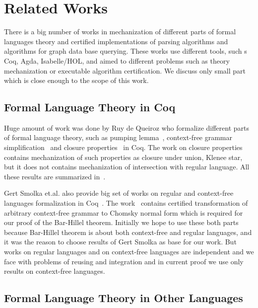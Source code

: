 \section{Related Works}

There is a big number of works in mechanization of different parts of formal languages theory and certified implementations of parsing algorithms and algorithms for graph data base querying.
These works use different tools, such s Coq, Agda, Isabelle/HOL, and aimed to different problems such as theory mechanization or executable algorithm certification.
We discuss only small part which is close enough to the scope of this work.

\subsection{Formal Language Theory in Coq}

Huge amount of work was done by Ruy de Queiroz who formalize different parts of formal language theory, such as pumping lemma~\cite{ramos2015formalizationPumping}, context-free grammar simplification~\cite{ramos2015formalization} and closure properties~\cite{ramos2015formalizationClosure} in Coq.
The work on closure properties contains mechanization of such properties as closure under union, Klenee star, but it does not contains mechanization of intersection with regular language.
All these results are summarized in~\cite{ramos2016formalization}. 

Gert Smolka et.al. also provide big set of works on regular and context-free languages formalization in Coq~\cite{smolka2017regular,smolka2013regular,kaiser2012constructive,smolkaHofmann2016}.
The work~\cite{smolkaHofmann2016} contains certified transformation of arbitrary context-free grammar to Chomsky normal form which is required for our proof of the Bar-Hillel theorem. 
Initially we hope to use these both parts because Bar-Hillel theorem is about both context-free and regular languages, and it was the reason to choose results of Gert Smolka as base for our work.
But works on regular languages and on context-free languages are independent and we face with  problems of reusing and integration and in current proof we use only results on context-free languages.

\subsection{Formal Language Theory in Other Languages}

